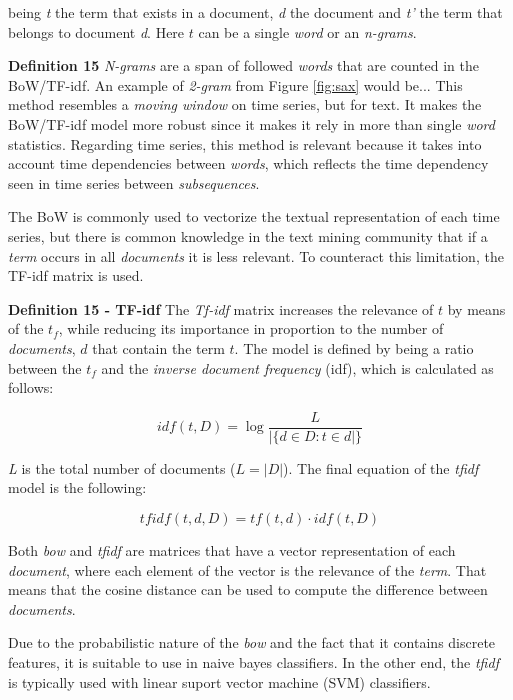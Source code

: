 being \textit{t} the term that exists in a document, \textit{d} the document and \textit{t'} the term that belongs to document \textit{d}. Here $t$ can be a single \textit{word} or an \textit{n-grams}.

\item \textbf{Definition 15} \textit{N-grams} are a span of followed \textit{words} that are counted in the BoW/TF-idf. An example of \textit{2-gram} from Figure \ref{fig:sax} would be...
This method resembles a \textit{moving window} on time series, but for text. It makes the BoW/TF-idf model more robust since it makes it rely in more than single \textit{word} statistics. Regarding time series, this method is relevant because it takes into account time dependencies between \textit{words}, which reflects the time dependency seen in time series between \textit{subsequences}.


The BoW is commonly used to vectorize the textual representation of each time series, but there is common knowledge in the text mining community that if a \textit{term} occurs in all \textit{documents} it is less relevant. To counteract this limitation, the TF-idf matrix is used.

\item \textbf{Definition 15 - TF-idf} The \textit{Tf-idf} matrix increases the relevance of $t$ by means of the $t_f$, while reducing its importance in proportion to the number of \textit{documents}, $d$ that contain the term $t$. The model is defined by being a ratio between the $t_f$ and the \textit{inverse document frequency} (idf), which is calculated as follows:

\begin{equation}
    idf(t, D) = \log{\frac{L}{|\{d \in D: t \in d|\}}}
\end{equation}

\textit{L} is the total number of documents ($L = |D|$). The final equation of the \textit{tfidf} model is the following:

\begin{equation}
\label{eq:tfidf}
    tfidf(t, d, D) = tf(t, d) \cdot idf(t, D) 
\end{equation}

Both \textit{bow} and \textit{tfidf} are matrices that have a vector representation of each \textit{document}, where each element of the vector is the relevance of the \textit{term}. That means that the cosine distance can be used to compute the difference between \textit{documents}.
\par
Due to the probabilistic nature of the \textit{bow} and the fact that it contains discrete features, it is suitable to use in naive bayes classifiers. In the other end, the \textit{tfidf} is typically used with linear suport vector machine (SVM) classifiers.

